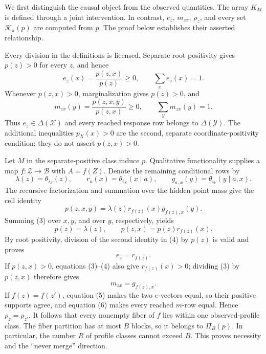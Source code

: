 We first distinguish the causal object from the observed quantities.  The
array \(K_M\) is defined through a joint intervention.  In contrast,
\(e_z\), \(m_{zx}\), \(\rho_z\), and every set
\(\mathcal K_\pi(p)\) are computed from \(p\).  The proof below establishes
their asserted relationship.

Every division in the definitions is licensed.  Separate root positivity
gives \(p(z)>0\) for every \(z\), and hence
\[
 e_z(x)=\frac{p(z,x)}{p(z)}\geq0,
 \qquad
 \sum_x e_z(x)=1.
\tag{1}
\]
Whenever \(p(z,x)>0\), marginalization gives \(p(z)>0\), and
\[
 m_{zx}(y)=\frac{p(z,x,y)}{p(z,x)}\geq0,
 \qquad
 \sum_y m_{zx}(y)=1.
\tag{2}
\]
Thus \(e_z\in\Delta(\mathcal X)\) and every reached response row belongs
to \(\Delta(\mathcal Y)\).  The additional inequalities \(p_X(x)>0\)
are the second, separate coordinate-positivity condition; they do not
assert \(p(z,x)>0\).

Let \(M\) in the separate-positive class induce \(p\).  Qualitative
functionality supplies a map \(f:\mathcal Z\to\mathcal B\) with
\(A=f(Z)\).  Denote the remaining conditional rows by
\[
 \lambda(z)=\theta_{i_Z}(z),\qquad
 r_a(x)=\theta_{i_X}(x\mid a),\qquad
 g_{a,x}(y)=\theta_{i_Y}(y\mid a,x).
\]
The recursive factorization and summation over the hidden point mass give
the cell identity
\[
 p(z,x,y)=\lambda(z)r_{f(z)}(x)g_{f(z),x}(y).
\tag{3}
\]
Summing (3) over \(x,y\), and over \(y\), respectively, yields
\[
 p(z)=\lambda(z),
 \qquad p(z,x)=p(z)r_{f(z)}(x).
\tag{4}
\]
By root positivity, division of the second identity in (4) by \(p(z)\)
is valid and proves
\[
 e_z=r_{f(z)}.
\tag{5}
\]
If \(p(z,x)>0\), equations (3)--(4) also give
\(r_{f(z)}(x)>0\); dividing (3) by \(p(z,x)\) therefore gives
\[
 m_{zx}=g_{f(z),x}.
\tag{6}
\]
If \(f(z)=f(z')\), equation (5) makes the two \(e\)-vectors equal, so
their positive supports agree, and equation (6) makes every reached
\(m\)-row equal.  Hence \(\rho_z=\rho_{z'}\).  It follows that every
nonempty fiber of \(f\) lies within one observed-profile class.  The
fiber partition has at most \(B\) blocks, so it belongs to
\(\Pi_B(p)\).  In particular, the number \(R\) of profile classes cannot
exceed \(B\).  This proves necessity and the ``never merge'' direction.

